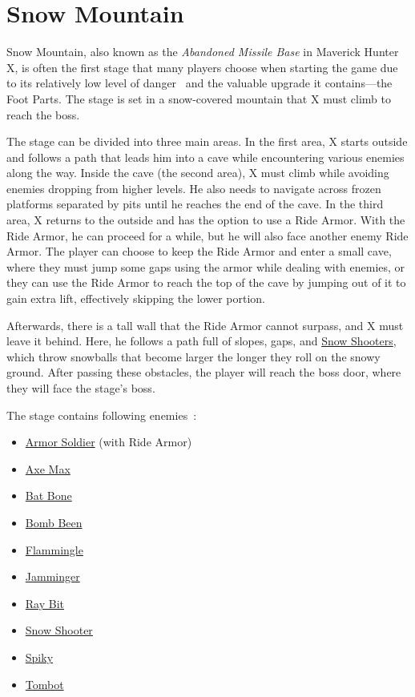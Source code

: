 \section{Snow Mountain}

Snow Mountain, also known as the \textit{Abandoned Missile Base} in Maverick Hunter X, is often the first stage that many players choose when starting the game due to its relatively low level of danger~\cite{stratwiki:Snow_mountain} and the valuable upgrade it contains—the Foot Parts. The stage is set in a snow-covered mountain that X must climb to reach the boss.

The stage can be divided into three main areas. In the first area, X starts outside and follows a path that leads him into a cave while encountering various enemies along the way. Inside the cave (the second area), X must climb while avoiding enemies dropping from higher levels. He also needs to navigate across frozen platforms separated by pits until he reaches the end of the cave. In the third area, X returns to the outside and has the option to use a Ride Armor. With the Ride Armor, he can proceed for a while, but he will also face another enemy Ride Armor. The player can choose to keep the Ride Armor and enter a small cave, where they must jump some gaps using the armor while dealing with enemies, or they can use the Ride Armor to reach the top of the cave by jumping out of it to gain extra lift, effectively skipping the lower portion.

Afterwards, there is a tall wall that the Ride Armor cannot surpass, and X must leave it behind. Here, he follows a path full of slopes, gaps, and \hyperlink{enem:Snow_Shooter}{Snow Shooters}, which throw snowballs that become larger the longer they roll on the snowy ground. After passing these obstacles, the player will reach the boss door, where they will face the stage's boss.

The stage contains following enemies~\cite{wiki:Snow_mountain}:
\begin{itemize}
	\item \hyperlink{enem:Armor_Soldier}{Armor Soldier} (with Ride Armor)
	\item \hyperlink{enem:Axe_Max}{Axe Max}
	\item \hyperlink{enem:Batton_Bone}{Bat Bone}
	\item \hyperlink{enem:Bomb_Been}{Bomb Been}
	\item \hyperlink{enem:Flammingle}{Flammingle}
	\item \hyperlink{enem:Jamminger}{Jamminger }
	\item \hyperlink{enem:Ray_Bit}{Ray Bit}
	\item \hyperlink{enem:Snow_Shooter}{Snow Shooter}
	\item \hyperlink{enem:Spiky}{Spiky}
	\item \hyperlink{enem:Tombot}{Tombot}
\end{itemize}

